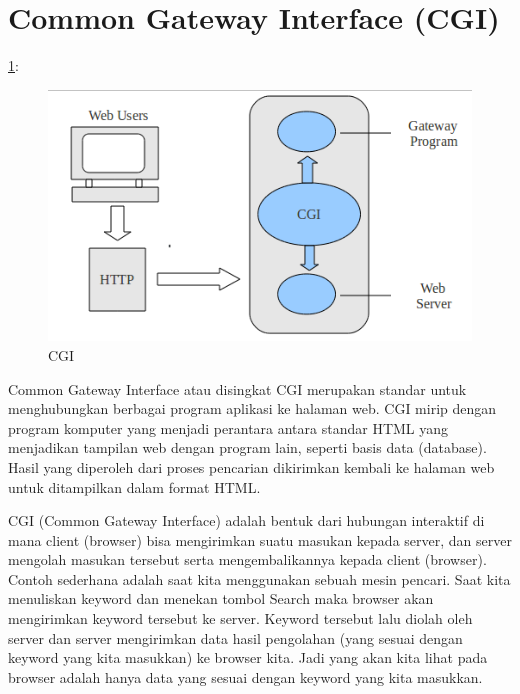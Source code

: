 \section{Common Gateway Interface (CGI)}
\ref{CGI}:
\begin{figure}[ht]
	\centerline{\includegraphics[width=1\textwidth]{figures/CGI.png}}
	\caption{CGI}
	\label{CGI}
\end{figure}
Common Gateway Interface atau disingkat CGI merupakan standar untuk menghubungkan berbagai program aplikasi ke halaman web. CGI mirip dengan program komputer yang menjadi perantara antara standar HTML yang menjadikan tampilan web dengan program lain, seperti basis data (database). Hasil yang diperoleh dari proses pencarian dikirimkan kembali ke halaman web untuk ditampilkan dalam format HTML.  \par
	\vspace{12pt}
CGI (Common Gateway Interface) adalah bentuk dari hubungan interaktif di mana client (browser) bisa mengirimkan suatu masukan kepada server, dan server mengolah masukan tersebut serta mengembalikannya kepada client (browser). Contoh sederhana adalah saat kita menggunakan sebuah mesin pencari. Saat kita menuliskan keyword dan menekan tombol Search maka browser akan mengirimkan keyword tersebut ke server. Keyword tersebut lalu diolah oleh server dan server mengirimkan data hasil pengolahan (yang sesuai dengan keyword yang kita masukkan) ke browser kita. Jadi yang akan kita lihat pada browser adalah  hanya data yang sesuai dengan keyword yang kita masukkan. \par
	

